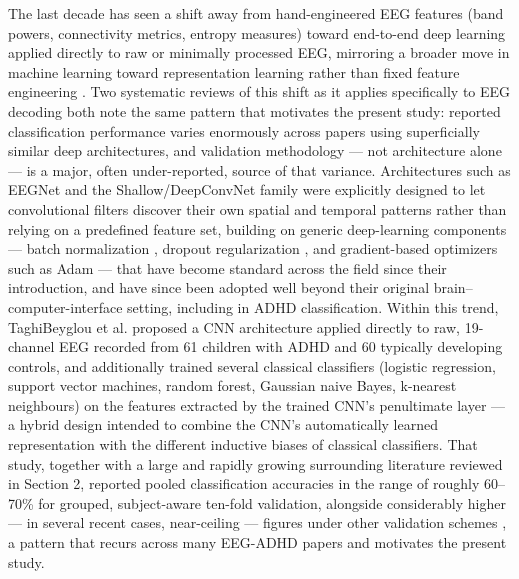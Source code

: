 \documentclass[a4paper,fleqn]{cas-sc}
\begin{document}
The last decade has seen a shift away from hand-engineered EEG features (band powers, connectivity metrics, entropy measures) toward end-to-end deep learning applied directly to raw or minimally processed EEG, mirroring a broader move in machine learning toward representation learning rather than fixed feature engineering \cite{lecun2015deep}. Two systematic reviews of this shift as it applies specifically to EEG decoding \cite{craik2019deep,roy2019deep} both note the same pattern that motivates the present study: reported classification performance varies enormously across papers using superficially similar deep architectures, and validation methodology --- not architecture alone --- is a major, often under-reported, source of that variance. Architectures such as EEGNet \cite{lawhern2018eegnet} and the Shallow/DeepConvNet family \cite{schirrmeister2017deep} were explicitly designed to let convolutional filters discover their own spatial and temporal patterns rather than relying on a predefined feature set, building on generic deep-learning components --- batch normalization \cite{ioffe2015batch}, dropout regularization \cite{srivastava2014dropout}, and gradient-based optimizers such as Adam \cite{kingma2015adam} --- that have become standard across the field since their introduction, and have since been adopted well beyond their original brain--computer-interface setting, including in ADHD classification. Within this trend, TaghiBeyglou et al. \cite{taghibeyglou2022detection} proposed a CNN architecture applied directly to raw, 19-channel EEG recorded from 61 children with ADHD and 60 typically developing controls, and additionally trained several classical classifiers (logistic regression, support vector machines, random forest, Gaussian naive Bayes, k-nearest neighbours) on the features extracted by the trained CNN's penultimate layer --- a hybrid design intended to combine the CNN's automatically learned representation with the different inductive biases of classical classifiers. That study, together with a large and rapidly growing surrounding literature reviewed in Section 2, reported pooled classification accuracies in the range of roughly 60--70\% for grouped, subject-aware ten-fold validation, alongside considerably higher --- in several recent cases, near-ceiling --- figures under other validation schemes \cite{amini2025adhdeepnet,hassan2024convolutional,esas2023detection,chen2019deep,latifi2024siamese,kasim2023identification,cura2024detection,bansal2025eeg,mao2025advanced,kim2025electroencephalogram}, a pattern that recurs across many EEG-ADHD papers and motivates the present study.
\end{document}
